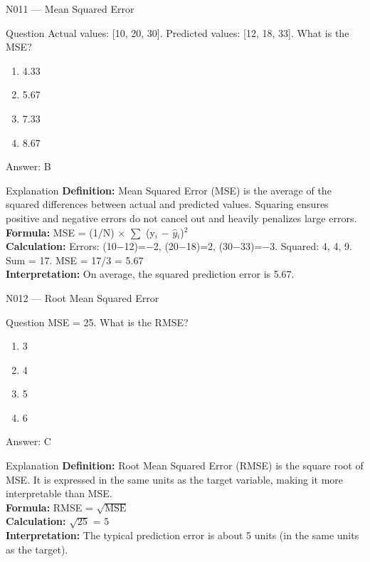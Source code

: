 \documentclass[aspectratio=169,8pt]{beamer}
\begin{document}
	\begin{frame}{N011 --- Mean Squared Error}
		\begin{block}{Question}
			Actual values: [10, 20, 30]. Predicted values: [12, 18, 33]. What is the MSE?
			\begin{enumerate}
				\item 4.33
				\item 5.67
				\item 7.33
				\item 8.67
			\end{enumerate}
		\end{block}
		\begin{exampleblock}{Answer: B}\end{exampleblock}
		\begin{block}{Explanation}
			\textbf{Definition:} Mean Squared Error (MSE) is the average of the squared differences between actual and predicted values. Squaring ensures positive and negative errors do not cancel out and heavily penalizes large errors.\\
			\textbf{Formula:} MSE = (1/N) $\times$ $\sum$ (y$_{i}$ $-$ $\hat{y}$$_{i}$)$^{2}$\\
			\textbf{Calculation:} Errors: (10$-$12)=$-$2, (20$-$18)=2, (30$-$33)=$-$3. Squared: 4, 4, 9. Sum = 17. MSE = 17/3 = 5.67\\
			\textbf{Interpretation:} On average, the squared prediction error is 5.67.
		\end{block}
	\end{frame}
	
	\begin{frame}{N012 --- Root Mean Squared Error}
		\begin{block}{Question}
			MSE = 25. What is the RMSE?
			\begin{enumerate}
				\item 3
				\item 4
				\item 5
				\item 6
			\end{enumerate}
		\end{block}
		\begin{exampleblock}{Answer: C}\end{exampleblock}
		\begin{block}{Explanation}
			\textbf{Definition:} Root Mean Squared Error (RMSE) is the square root of MSE. It is expressed in the same units as the target variable, making it more interpretable than MSE.\\
			\textbf{Formula:} RMSE = $\sqrt{\text{MSE}}$\\
			\textbf{Calculation:} $\sqrt{25}$ = 5\\
			\textbf{Interpretation:} The typical prediction error is about 5 units (in the same units as the target).
		\end{block}
	\end{frame}
	
\end{document}
